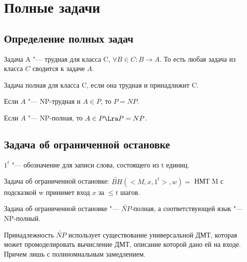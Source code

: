 \section{Полные задачи}	
\subsection{Определение полных задач}
\begin{Def}
	Задача A "--- трудная для класса C, $\forall B \in C \colon B \to A$.
	То есть любая задача из класса $C$ сводится к задаче $A$. 
\end{Def}

\begin{Def}
	Задача полная для класса C, если она трудная и принадлижит C.
\end{Def}

\begin{theorem}
	Если $A$ "--- NP-трудная и $A \in P$,
	то $P = NP$.
\end{theorem}
\begin{conseq}
	Если $A$ "--- NP-полная, то $A \in P \Lra P = NP$.
\end{conseq}

\subsection{Задача об ограниченной остановке}
\begin{Def}
	$1^t$ "--- обозначение для записи слова, состоящего из t единиц.
\end{Def}
\begin{Def}
	Задача об ограниченной остановке: 
	$\tilde{BH}(<M, x, 1^t>, w) =$ НМТ
	M с подсказкой w принимет вход $x$ за $\le t$ шагов.
\end{Def}
\begin{theorem}
	Задача об ограниченной остановке "--- $\tilde{NP}$-полная, 
	а соответствующей язык "--- NP-полный. 
\end{theorem}
\begin{Rem}
	Принадлежность $\tilde{NP}$ использует существование универсальной ДМТ, которая 
	может промоделировать вычисление ДМТ, описание которой дано ей на входе. Причем лишь с полиномиальным замедлением. 
\end{Rem}

